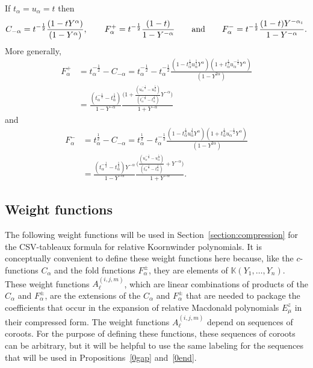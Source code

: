 \documentclass[11pt]{article}
\theoremstyle{plain}
\theoremstyle{definition}
\theoremstyle{remark}
\numberwithin{equation}{section}
\def\KK{\mathbb{K}}
\newcounter{r}
\newcounter{s}
\begin{document}
If $t_{\alpha} = u_{\alpha}=t$ then
$$
C_{-\alpha} = t^{-\frac12}\frac{(1-tY^{\alpha})}{(1-Y^{\alpha})}, \qquad
F_{\alpha}^+ = t^{-\frac12}\frac{(1-t)}{1-Y^{-\alpha}}
\qquad\hbox{and}\qquad
F_{\alpha}^- = t^{-\frac12}\frac{(1-t)Y^{-\alpha_i}}{1-Y^{-\alpha}}.
$$
More generally,
\begin{align*}
F_{\alpha}^+ &= t_{\alpha}^{-\frac12} - C_{-\alpha}
= t_{\alpha}^{-\frac12} -  t^{-\frac12}_{\alpha}
\frac{(1-t_{\alpha}^{\frac12}u_{\alpha}^{\frac12}Y^{\alpha})
(1+t_{\alpha}^{\frac12}u_{\alpha}^{-\frac12}Y^{\alpha})}
{(1-Y^{2\alpha})}  \\
&= \frac{(t_{\alpha}^{-\frac12}-t_{\alpha}^{\frac12}) }{ 1-Y^{-\alpha} }
\frac{\Big(
1+\frac{(u_{\alpha}^{-\frac12}-u_{\alpha}^{\frac12})} {(t_{\alpha}^{-\frac12}-t_{\alpha}^{\frac12})}
Y^{-\alpha}\Big) }{1+Y^{-\alpha}}
\end{align*}
and
\begin{align*}
F_{\alpha}^- 
&= t_{\alpha}^{\frac12}  -  C_{-\alpha} 
= t_{\alpha}^{\frac12} -  t^{-\frac12}_{\alpha}
\frac{(1-t_{\alpha}^{\frac12}u_{\alpha}^{\frac12}Y^{\alpha})
(1+t_{\alpha}^{\frac12}u_{\alpha}^{-\frac12}Y^{\alpha})}
{(1-Y^{2\alpha})}  \\
&= \frac{ (t_{\alpha}^{-\frac12}-t_{\alpha}^{\frac12})Y^{-\alpha} }{1-Y^{-\alpha} }
\frac{\Big( \frac{(u_{\alpha}^{-\frac12}-u_{\alpha}^{\frac12}) }{(t_{\alpha}^{-\frac12}-t_{\alpha}^{\frac12})} 
+Y^{-\alpha} \Big) }
{1+Y^{-\alpha} }.
\end{align*}


\subsection{Weight functions}\label{subsec:weight functions}

The following weight functions will be used in Section~\ref{section:compression} for the CSV-tableaux formula for relative Koornwinder polynomials. It is conceptually convenient to define these weight functions here because, like the $c$-functions $C_\alpha$ and the fold functions $F_\alpha^\pm$, they are elements of $\KK(Y_1, \ldots,Y_n)$.
These weight functions $A^{(i,j,m)}_\ell$, which are linear combinations of products of the $C_\alpha$ and $F_\alpha^\pm$, are the extensions of the $C_\alpha$ and $F_\alpha^\pm$ that are needed to package the coefficients that occur in the expansion of relative Macdonald polynomials $E^z_\mu$ in their compressed form.
The weight functions $A^{(i,j,m)}_\ell$ depend on sequences of coroots. For the purpose of defining these functions, these sequences of coroots can be arbitrary, but it will be helpful to use the same labeling for the sequences that will be used in Propositions~\ref{0gap} and~\ref{0end}.
\end{document}

